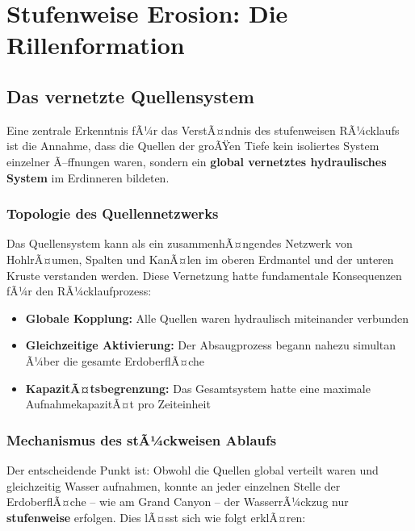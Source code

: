 ﻿\documentclass[12pt,a4paper]{report}
\begin{document}
\chapter{Stufenweise Erosion: Die Rillenformation}

\section{Das vernetzte Quellensystem}

Eine zentrale Erkenntnis fÃ¼r das VerstÃ¤ndnis des stufenweisen RÃ¼cklaufs ist die Annahme, dass die Quellen der groÃŸen Tiefe kein isoliertes System einzelner Ã–ffnungen waren, sondern ein \textbf{global vernetztes hydraulisches System} im Erdinneren bildeten.

\subsection{Topologie des Quellennetzwerks}

Das Quellensystem kann als ein zusammenhÃ¤ngendes Netzwerk von HohlrÃ¤umen, Spalten und KanÃ¤len im oberen Erdmantel und der unteren Kruste verstanden werden. Diese Vernetzung hatte fundamentale Konsequenzen fÃ¼r den RÃ¼cklaufprozess:

\begin{itemize}
	\item \textbf{Globale Kopplung:} Alle Quellen waren hydraulisch miteinander verbunden
	\item \textbf{Gleichzeitige Aktivierung:} Der Absaugprozess begann nahezu simultan Ã¼ber die gesamte ErdoberflÃ¤che
	\item \textbf{KapazitÃ¤tsbegrenzung:} Das Gesamtsystem hatte eine maximale AufnahmekapazitÃ¤t pro Zeiteinheit
\end{itemize}

\subsection{Mechanismus des stÃ¼ckweisen Ablaufs}

Der entscheidende Punkt ist: Obwohl die Quellen global verteilt waren und gleichzeitig Wasser aufnahmen, konnte an jeder einzelnen Stelle der ErdoberflÃ¤che -- wie am Grand Canyon -- der WasserrÃ¼ckzug nur \textbf{stufenweise} erfolgen. Dies lÃ¤sst sich wie folgt erklÃ¤ren:
\end{document}
